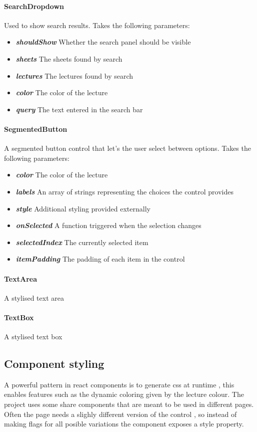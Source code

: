 \paragraph{SearchDropdown} Used to show search results. Takes the following parameters:
\begin{itemize}
	\item \textit{\textbf{shouldShow}} Whether the search panel should be visible
	\item \textit{\textbf{sheets}} The sheets found by search
	\item \textit{\textbf{lectures}} The lectures found by search
	\item \textit{\textbf{color}} The color of the lecture
	\item \textit{\textbf{query}} The text entered in the search bar
\end{itemize}
\paragraph{SegmentedButton} A segmented button control that let's the user select between options. Takes the following parameters:
\begin{itemize}
	\item \textit{\textbf{color}} The color of the lecture
	\item \textit{\textbf{labels}} An array of strings representing the choices the control provides
	\item \textit{\textbf{style}} Additional styling provided externally
	\item \textit{\textbf{onSelected}} A function triggered when the selection changes
	\item \textit{\textbf{selectedIndex}} The currently selected item
	\item \textit{\textbf{itemPadding}} The padding of each item in the control
\end{itemize}
\paragraph{TextArea} A stylised text area
\paragraph{TextBox} A stylised text box
\clearpage
\subsection{Component styling}
A powerful pattern in react components is to generate css at runtime , this enables features such as the dynamic coloring given by the lecture colour. The project uses some share components that are meant to be used in different pages. Often the page needs a slighly different version of the control , so instead of making flags for all posible variations the component exposes a style property.

